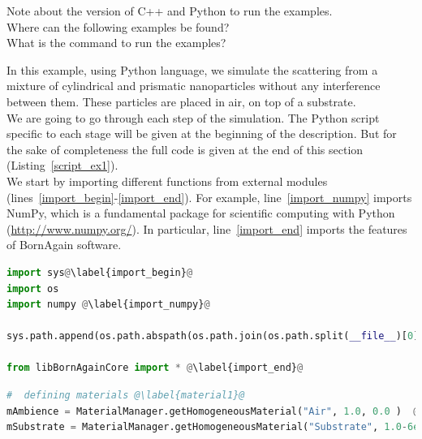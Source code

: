 \noindent Note about the version of C++ and Python to run the
examples.\\

\noindent Where can the following examples be found?\\


\noindent What is the command to run the examples?


In this example, using Python language, we simulate the scattering from a mixture of
cylindrical and prismatic nanoparticles without any interference
between them. These particles are placed in air, on top
of a substrate.\\ We are going to go through each step of the
simulation. The Python script specific to each stage will be given at
the beginning of the description. But for the sake of completeness the full code is given
at the end of this section (Listing~\ref{script_ex1}). \\

\noindent We start by importing different functions from external
modules (lines~\ref{import_begin}-\ref{import_end}). For example,
line~\ref{import_numpy}  imports NumPy, which
is a fundamental package for scientific computing with Python
(\url{http://www.numpy.org/}).  In particular, line~\ref{import_end}
imports the features of BornAgain software.\\


\begin{lstlisting}[language=python, style=eclipseboxed,name=ex1,nolol]
import sys@\label{import_begin}@
import os
import numpy @\label{import_numpy}@

sys.path.append(os.path.abspath(os.path.join(os.path.split(__file__)[0],'..', '..', '..', 'lib')))

from libBornAgainCore import * @\label{import_end}@
\end{lstlisting}




\begin{lstlisting}[language=python, style=eclipseboxed,name=ex1,nolol]
#  defining materials @\label{material1}@
mAmbience = MaterialManager.getHomogeneousMaterial("Air", 1.0, 0.0 )  @\label{material2}@
mSubstrate = MaterialManager.getHomogeneousMaterial("Substrate", 1.0-6e-6, 2e-8) @\label{material3}@
\end{lstlisting}

